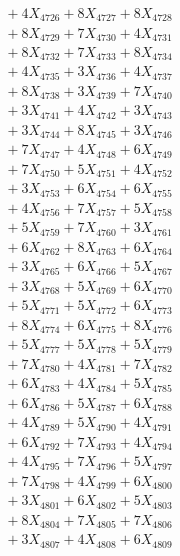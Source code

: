 \documentclass[a4paper,10pt]{article}
\begin{document}
{\begin{align}
&\;  + 4 X_{4726} + 8 X_{4727} + 8 X_{4728} \\[0.3ex]
&\;  + 8 X_{4729} + 7 X_{4730} + 4 X_{4731} \\[0.3ex]
&\;  + 8 X_{4732} + 7 X_{4733} + 8 X_{4734} \\[0.3ex]
&\;  + 4 X_{4735} + 3 X_{4736} + 4 X_{4737} \\[0.3ex]
&\;  + 8 X_{4738} + 3 X_{4739} + 7 X_{4740} \\[0.3ex]
&\;  + 3 X_{4741} + 4 X_{4742} + 3 X_{4743} \\[0.3ex]
&\;  + 3 X_{4744} + 8 X_{4745} + 3 X_{4746} \\[0.3ex]
&\;  + 7 X_{4747} + 4 X_{4748} + 6 X_{4749} \\[0.5ex]\allowbreak
&\;  + 7 X_{4750} + 5 X_{4751} + 4 X_{4752} \\[0.3ex]
&\;  + 3 X_{4753} + 6 X_{4754} + 6 X_{4755} \\[0.3ex]
&\;  + 4 X_{4756} + 7 X_{4757} + 5 X_{4758} \\[0.3ex]
&\;  + 5 X_{4759} + 7 X_{4760} + 3 X_{4761} \\[0.3ex]
&\;  + 6 X_{4762} + 8 X_{4763} + 6 X_{4764} \\[0.3ex]
&\;  + 3 X_{4765} + 6 X_{4766} + 5 X_{4767} \\[0.3ex]
&\;  + 3 X_{4768} + 5 X_{4769} + 6 X_{4770} \\[0.3ex]
&\;  + 5 X_{4771} + 5 X_{4772} + 6 X_{4773} \\[0.3ex]
&\;  + 8 X_{4774} + 6 X_{4775} + 8 X_{4776} \\[0.3ex]
&\;  + 5 X_{4777} + 5 X_{4778} + 5 X_{4779} \\[0.5ex]\allowbreak
&\;  + 7 X_{4780} + 4 X_{4781} + 7 X_{4782} \\[0.3ex]
&\;  + 6 X_{4783} + 4 X_{4784} + 5 X_{4785} \\[0.3ex]
&\;  + 6 X_{4786} + 5 X_{4787} + 6 X_{4788} \\[0.3ex]
&\;  + 4 X_{4789} + 5 X_{4790} + 4 X_{4791} \\[0.3ex]
&\;  + 6 X_{4792} + 7 X_{4793} + 4 X_{4794} \\[0.3ex]
&\;  + 4 X_{4795} + 7 X_{4796} + 5 X_{4797} \\[0.3ex]
&\;  + 7 X_{4798} + 4 X_{4799} + 6 X_{4800} \\[0.3ex]
&\;  + 3 X_{4801} + 6 X_{4802} + 5 X_{4803} \\[0.3ex]
&\;  + 8 X_{4804} + 7 X_{4805} + 7 X_{4806} \\[0.3ex]
&\;  + 3 X_{4807} + 4 X_{4808} + 6 X_{4809} \\[0.5ex]\allowbreak

\end{align}}
\end{document}
